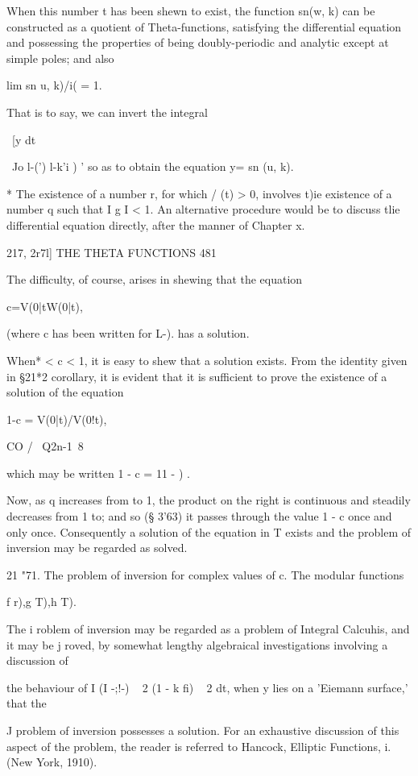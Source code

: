 When this number t has been shewn to exist, the function sn(w, k) can
be constructed as a quotient of Theta-functions, satisfying the
differential equation and possessing the properties of being
doubly-periodic and analytic except at simple poles; and also

lim sn u, k)/i( = 1.

That is to say, we can invert the integral

\ [y dt

 ~Jo l-(') l-k'i ) ' so as to obtain the equation y= sn (u, k).

* The existence of a number r, for which / (t) > 0, involves t)ie
existence of a number q such that I g I < 1. An alternative procedure
would be to discuss tlie differential equation directly, after the
manner of Chapter x.

217, 2r7l] THE THETA FUNCTIONS 481

The difficulty, of course, arises in shewing that the equation

c=V(0|tW(0|t),

(where c has been written for L-). has a solution.

When* < c < 1, it is easy to shew that a solution exists. From the
identity given in §21*2 corollary, it is evident that it is sufficient
to prove the existence of a solution of the equation

1-c = V(0|t)/V(0!t),

CO / \ Q2n-1\ 8

which may be written 1 - c = 11 - ) .

Now, as q increases from to 1, the product on the right is continuous
and steadily decreases from 1 to; and so (§ 3'63) it passes through
the value 1 - c once and only once. Consequently a solution of the
equation in T exists and the problem of inversion may be regarded as
solved.

21 "71. The problem of inversion for complex values of c. The modular
functions

f r),g T),h T).

The i roblem of inversion may be regarded as a problem of Integral
Calcuhis, and it may be j roved, by somewhat lengthy algebraical
investigations involving a discussion of

the behaviour of I (I -;!-) ~ 2 (1 - k fi) ~ 2 dt, when y lies on a
'Eiemann surface,' that the

J problem of inversion possesses a solution. For an exhaustive
discussion of this aspect of the problem, the reader is referred to
Hancock, Elliptic Functions, i. (New York, 1910).

